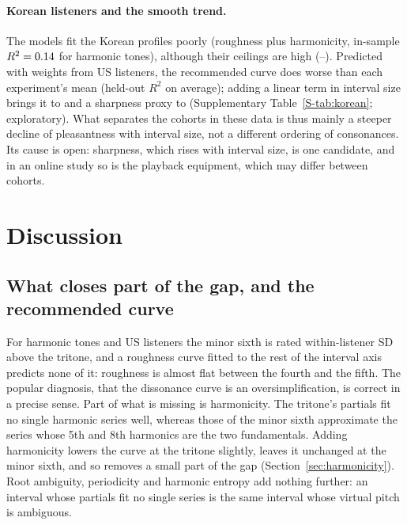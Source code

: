 \documentclass[11pt,a4paper]{article}
\begin{document}
\paragraph{Korean listeners and the smooth trend.}
The models fit the Korean profiles poorly (roughness plus harmonicity, in-sample
$R^2=0.14$ for harmonic tones), although their ceilings are high
(\krCeilMin--\krCeilMax). Predicted with weights from US listeners, the recommended curve
does worse than each experiment's mean (held-out $R^2$ \krHoTw{} on average); adding a linear
term in interval size brings it to \krHoSize{} and a sharpness proxy to \krHoSharp
(Supplementary Table~\ref{S-tab:korean}; exploratory). What separates the cohorts in these
data is thus mainly a steeper decline of pleasantness with interval size, not a different
ordering of consonances. Its cause is open: sharpness, which rises with interval size, is one
candidate, and in an online study so is the playback equipment, which may differ between
cohorts.


\section{Discussion}

\subsection{What closes part of the gap, and the recommended curve}
\label{sec:curve}
For harmonic tones and US listeners the minor sixth is rated \poolGapObsHarm{}
within-listener SD above the tritone, and a roughness curve fitted to the
rest of the interval axis predicts none of it: roughness is almost flat between the fourth and
the fifth. The popular diagnosis, that the dissonance curve is an oversimplification, is
correct in a precise sense. Part of what is missing is harmonicity. The tritone's partials fit no
single harmonic series well, whereas those of the minor sixth approximate the series whose 5th
and 8th harmonics are the two fundamentals. Adding harmonicity lowers the curve at the
tritone slightly, leaves it unchanged at the minor sixth, and so removes a small part of
the gap (Section~\ref{sec:harmonicity}). Root ambiguity, periodicity and harmonic entropy add nothing further: an
interval whose partials fit no single series is the same interval whose virtual pitch is
ambiguous.
\end{document}
